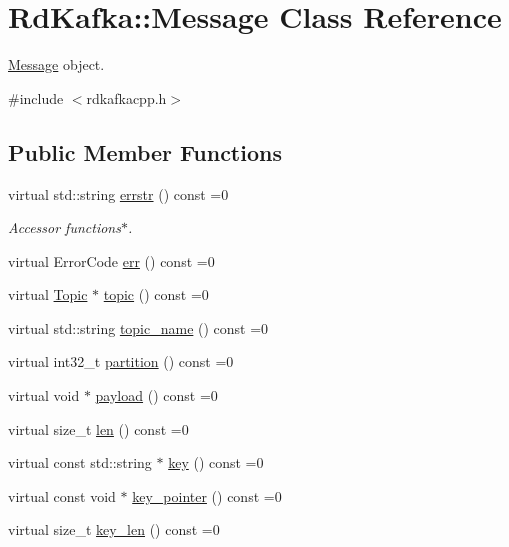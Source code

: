 \hypertarget{classRdKafka_1_1Message}{
\section{RdKafka::Message Class Reference}
\label{classRdKafka_1_1Message}
}


\hyperlink{classRdKafka_1_1Message}{Message} object.  


{\ttfamily \#include $<$rdkafkacpp.h$>$}\subsection*{Public Member Functions}
\begin{DoxyCompactItemize}
\item 
virtual std::string \hyperlink{classRdKafka_1_1Message_a3f3471916c7375945d837b05af05aa94}{errstr} () const =0
\begin{DoxyCompactList}\small\item\em Accessor functions$\ast$. \item\end{DoxyCompactList}\item 
virtual ErrorCode \hyperlink{classRdKafka_1_1Message_a90df1fd2a73a74220c9581e6bedb42f2}{err} () const =0
\item 
virtual \hyperlink{classRdKafka_1_1Topic}{Topic} $\ast$ \hyperlink{classRdKafka_1_1Message_a6eb88c584037280b796500d541251938}{topic} () const =0
\item 
virtual std::string \hyperlink{classRdKafka_1_1Message_a02e16f76e8d248fe47e0f09ff2d13492}{topic\_\-name} () const =0
\item 
virtual int32\_\-t \hyperlink{classRdKafka_1_1Message_aebc6b57026d44ade6c75d5e421fa4384}{partition} () const =0
\item 
virtual void $\ast$ \hyperlink{classRdKafka_1_1Message_ae7426658cd22855e80d3169b85ca2d27}{payload} () const =0
\item 
virtual size\_\-t \hyperlink{classRdKafka_1_1Message_a68d94e027f0df784632880d24a43b3f9}{len} () const =0
\item 
virtual const std::string $\ast$ \hyperlink{classRdKafka_1_1Message_a2430de7003342977001c9bab7604f152}{key} () const =0
\item 
virtual const void $\ast$ \hyperlink{classRdKafka_1_1Message_a565d08ab88de128aca7efb57c3ed6c15}{key\_\-pointer} () const =0
\item 
virtual size\_\-t \hyperlink{classRdKafka_1_1Message_acde2505155defd52a279950113447dbb}{key\_\-len} () const =0

\end{DoxyCompactItemize}
